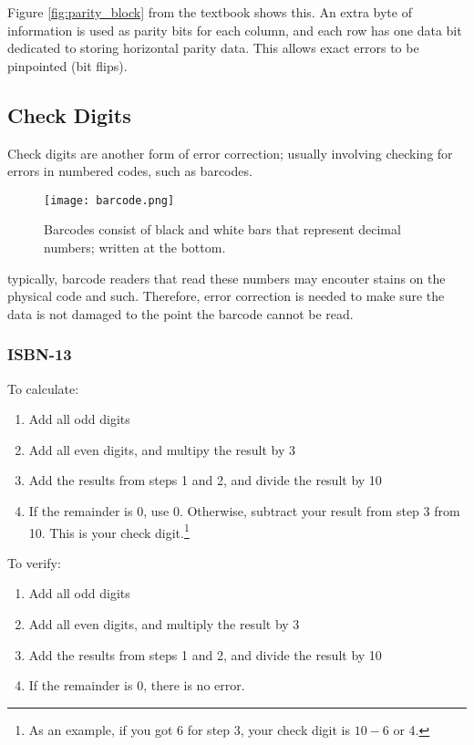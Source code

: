 \documentclass[../main.tex]{subfiles}
\begin{document}
Figure \ref{fig:parity_block} from the textbook shows this. An extra byte of information is used as parity bits for each column, and each row has one data bit dedicated to storing horizontal parity data. This allows exact errors to be pinpointed (bit flips).

\subsection{Check Digits}

Check digits are another form of error correction; usually involving checking for errors in numbered codes, such as barcodes.

\begin{figure}[h]
    \centering
    \texttt{[image: barcode.png]}
    \caption{Barcodes consist of black and white bars that represent decimal numbers; written at the bottom.}
    \label{fig:barcode}
\end{figure}

typically, barcode readers that read these numbers may encouter stains on the physical code and such. Therefore, error correction is needed to make sure the data is not damaged to the point the barcode cannot be read.

\subsubsection{ISBN-13}

To calculate:

\begin{enumerate}
    \item Add all odd digits
    \item Add all even digits, and multipy the result by 3
    \item Add the results from steps 1 and 2, and divide the result by 10
    \item If the remainder is 0, use 0. Otherwise, subtract your result from step 3 from 10. This is your check digit.\footnote{As an example, if you got 6 for step 3, your check digit is $10-6$ or 4.}
\end{enumerate}

To verify:

\begin{enumerate}
    \item Add all odd digits
    \item Add all even digits, and multiply the result by 3
    \item Add the results from steps 1 and 2, and divide the result by 10
    \item If the remainder is 0, there is no error.
\end{enumerate}
\end{document}
